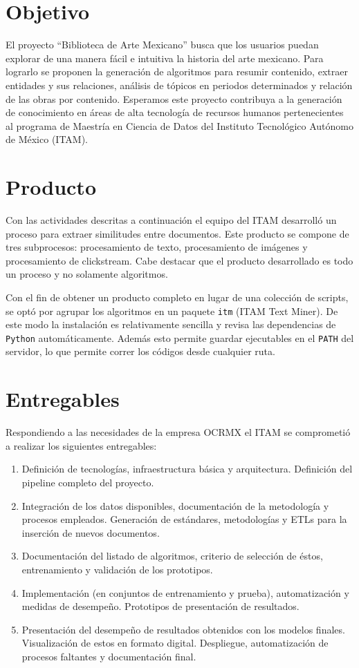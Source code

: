 \section{Objetivo}
El proyecto “Biblioteca de Arte Mexicano” busca que los usuarios puedan explorar de una manera fácil e intuitiva la historia del arte mexicano. Para lograrlo se proponen la generación de algoritmos para resumir contenido, extraer entidades y sus relaciones, análisis de tópicos en periodos determinados y relación de las obras por contenido. 
Esperamos este proyecto contribuya  a la generación de conocimiento en áreas de alta tecnología de recursos humanos pertenecientes al programa de Maestría en Ciencia de Datos del Instituto Tecnológico Autónomo de México (ITAM).

\section{Producto}
Con las actividades descritas a continuación  el equipo del ITAM desarrolló un proceso para extraer similitudes entre documentos. Este producto se compone de tres subprocesos: procesamiento de texto, procesamiento de imágenes y  procesamiento de clickstream. Cabe destacar que el producto desarrollado es todo un proceso y  no solamente algoritmos.   

Con el fin de obtener un producto completo en lugar de una colección de scripts, se optó por agrupar los algoritmos en un paquete \texttt{itm} (ITAM Text Miner). De este modo la instalación es relativamente sencilla y revisa las dependencias de \texttt{Python} automáticamente. Además esto  permite guardar ejecutables en el \texttt{PATH} del servidor, lo que permite correr los códigos desde cualquier ruta.



\section{Entregables}

Respondiendo a las necesidades de la empresa OCRMX el ITAM se comprometió a realizar los siguientes entregables: 
\begin{enumerate}
\item Definición de tecnologías, infraestructura básica y arquitectura. Definición del pipeline completo del proyecto. 
\item Integración de los datos disponibles, documentación de la metodología y procesos empleados. Generación de estándares, metodologías y ETLs para la inserción de nuevos documentos.
\item Documentación del listado de algoritmos, criterio de selección de éstos, entrenamiento y validación de los prototipos. \item Implementación (en conjuntos de entrenamiento y prueba), automatización y medidas de desempeño. Prototipos de presentación de resultados.
\item Presentación del desempeño de resultados obtenidos con los modelos finales. Visualización de estos en formato digital. 
Despliegue, automatización de procesos faltantes y documentación final.

\end{enumerate}

